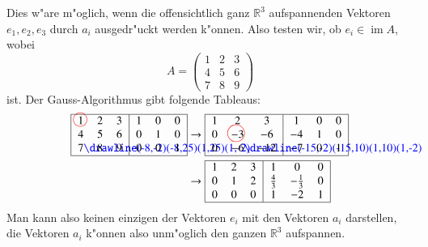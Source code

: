 \begin{beispiel}
Dies w"are m"oglich, wenn die offensichtlich ganz $\mathbb R^3$
aufspannenden Vektoren $e_1,e_2,e_3$ durch $a_i$ ausgedr"uckt werden
k"onnen.
Also testen wir, ob $e_i\in \operatorname{im}A$, wobei
\[
A=\begin{pmatrix}
1&2&3\\
4&5&6\\
7&8&9
\end{pmatrix}
\]
ist.
Der Gauss-Algorithmus gibt folgende Tableaus:
\begin{align*}
\begin{tabular}{|>{$}c<{$}>{$}c<{$}>{$}c<{$}|>{$}c<{$}>{$}c<{$}>{$}c<{$}|}
\hline
1%
\begin{picture}(0,0)
\color{red}\put(-3,4){\circle{12}}
\end{picture}%
&2&3&1&0&0\\
4&5&6&0&1&0\\
7%
\begin{picture}(0,0)
\color{blue}\drawline(-8,-2)(-8,25)(1,25)(1,-2)
\end{picture}%
&8&9&0&0&1\\
\hline
\end{tabular}
&\rightarrow
\begin{tabular}{|>{$}c<{$}>{$}c<{$}>{$}c<{$}|>{$}c<{$}>{$}c<{$}>{$}c<{$}|}
\hline
1&2&3&1&0&0\\
0&-3%
\begin{picture}(0,0)
\color{red}\put(-7,4){\circle{15}}
\end{picture}%
&-6&-4&1&0\\
0&-6%
\begin{picture}(0,0)
\color{blue}\drawline(-15,-2)(-15,10)(1,10)(1,-2)
\end{picture}%
&-12&-7&0&1\\
\hline
\end{tabular}
\\
&\rightarrow
\begin{tabular}{|>{$}c<{$}>{$}c<{$}>{$}c<{$}|>{$}c<{$}>{$}c<{$}>{$}c<{$}|}
\hline
1&2&3&1&0&0\\
0&1&2&\frac43&-\frac13&0\\
0&0&0&1&-2&1\\
\hline
\end{tabular}
\end{align*}
Man kann also keinen einzigen der Vektoren $e_i$ mit den Vektoren $a_i$
darstellen, die Vektoren $a_i$ k"onnen also unm"oglich den ganzen
$\mathbb R^3$ aufspannen.
\end{beispiel}

